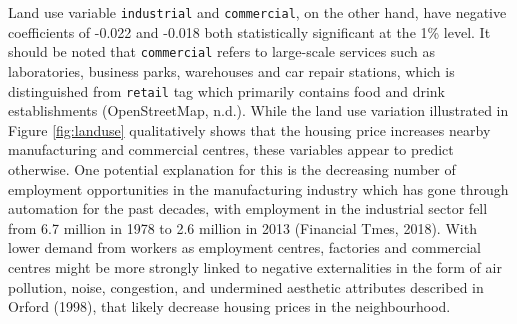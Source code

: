 \documentclass{article}
\begin{document}
Land use variable \texttt{industrial} and \texttt{commercial}, on the other hand, have negative coefficients of -0.022 and -0.018 both statistically significant at the 1\% level. It should be noted that \texttt{commercial} refers to large-scale services such as laboratories, business parks, warehouses and car repair stations, which is distinguished from \texttt{retail} tag which primarily contains food and drink establishments (OpenStreetMap, n.d.). While the land use variation illustrated in Figure \ref{fig:landuse} qualitatively shows that the housing price increases nearby manufacturing and commercial centres, these variables appear to predict otherwise. One potential explanation for this is the decreasing number of employment opportunities in the manufacturing industry which has gone through automation for the past decades, with employment in the industrial sector fell from 6.7 million in 1978 to 2.6 million in 2013 (Financial Tmes, 2018). With lower demand from workers as employment centres, factories and commercial centres might be more strongly linked to negative externalities in the form of air pollution, noise, congestion, and undermined aesthetic attributes described in Orford (1998), that likely decrease housing prices in the neighbourhood.\\\\
\end{document}

